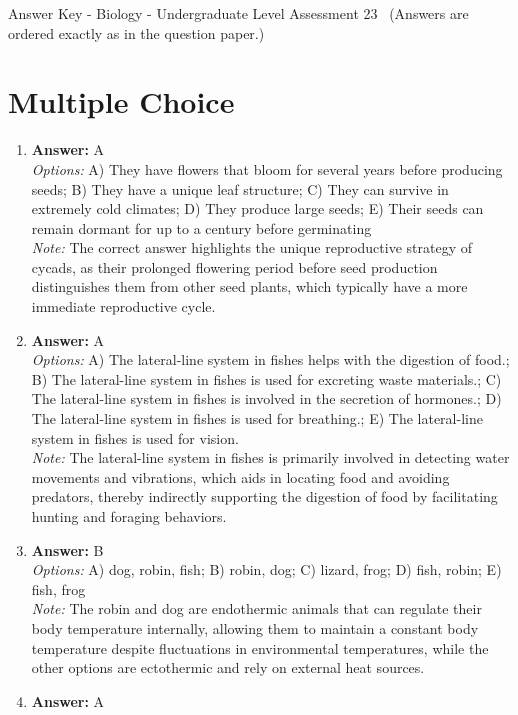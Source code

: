 \documentclass[12pt]{article}
\begin{document}
\begin{center}
Answer Key - Biology - Undergraduate Level Assessment 23 \
\small (Answers are ordered exactly as in the question paper.)
\end{center}

\section*{Multiple Choice}
\begin{enumerate}[label=\arabic*.]
\item \textbf{Answer:} A
\\ \textit{Options:} A) They have flowers that bloom for several years before producing seeds; B) They have a unique leaf structure; C) They can survive in extremely cold climates; D) They produce large seeds; E) Their seeds can remain dormant for up to a century before germinating
\\ \textit{Note:} The correct answer highlights the unique reproductive strategy of cycads, as their prolonged flowering period before seed production distinguishes them from other seed plants, which typically have a more immediate reproductive cycle.
\item \textbf{Answer:} A
\\ \textit{Options:} A) The lateral-line system in fishes helps with the digestion of food.; B) The lateral-line system in fishes is used for excreting waste materials.; C) The lateral-line system in fishes is involved in the secretion of hormones.; D) The lateral-line system in fishes is used for breathing.; E) The lateral-line system in fishes is used for vision.
\\ \textit{Note:} The lateral-line system in fishes is primarily involved in detecting water movements and vibrations, which aids in locating food and avoiding predators, thereby indirectly supporting the digestion of food by facilitating hunting and foraging behaviors.
\item \textbf{Answer:} B
\\ \textit{Options:} A) dog, robin, fish; B) robin, dog; C) lizard, frog; D) fish, robin; E) fish, frog
\\ \textit{Note:} The robin and dog are endothermic animals that can regulate their body temperature internally, allowing them to maintain a constant body temperature despite fluctuations in environmental temperatures, while the other options are ectothermic and rely on external heat sources.
\item \textbf{Answer:} A

\end{enumerate}
\end{document}
